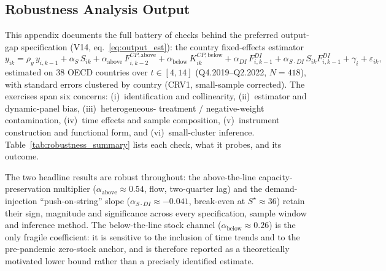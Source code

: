 \documentclass[12pt, a4paper]{article}
\begin{document}


\subsection{Robustness Analysis Output}
\label{app:robustness_output}
This appendix documents the full battery of checks behind the preferred
output-gap specification (V14, eq.~\ref{eq:output_est}): the country
fixed-effects estimator
\[
y_{ik}=\rho_y\,y_{i,k-1}+\alpha_S\,S_{ik}
       +\alpha_{\text{above}}\,F^{CP,\text{above}}_{i,k-2}
       +\alpha_{\text{below}}\,K^{CP,\text{below}}_{ik}
       +\alpha_{DI}\,F^{DI}_{i,k-1}
       +\alpha_{S\cdot DI}\,S_{ik}F^{DI}_{i,k-1}
       +\gamma_i+\varepsilon_{ik},
\]
estimated on 38 OECD countries over $t\in[4,14]$ (Q4.2019--Q2.2022,
$N=418$), with standard errors clustered by country (CRV1, small-sample
corrected). The exercises span six concerns: (i)~identification and
collinearity, (ii)~estimator and dynamic-panel bias, (iii)~heterogeneous-
treatment / negative-weight contamination, (iv)~time effects and sample
composition, (v)~instrument construction and functional form, and
(vi)~small-cluster inference. Table~\ref{tab:robustness_summary} lists each
check, what it probes, and its outcome.

The two headline results are robust throughout: the above-the-line
capacity-preservation multiplier ($\alpha_{\text{above}}\approx0.54$, flow,
two-quarter lag) and the demand-injection ``push-on-string'' slope
($\alpha_{S\cdot DI}\approx-0.041$, break-even at $S^\star\approx36$) retain
their sign, magnitude and significance across every specification, sample
window and inference method. The below-the-line stock channel
($\alpha_{\text{below}}\approx0.26$) is the only fragile coefficient: it is
sensitive to the inclusion of time trends and to the pre-pandemic
zero-stock anchor, and is therefore reported as a theoretically motivated
lower bound rather than a precisely identified estimate.
\end{document}
